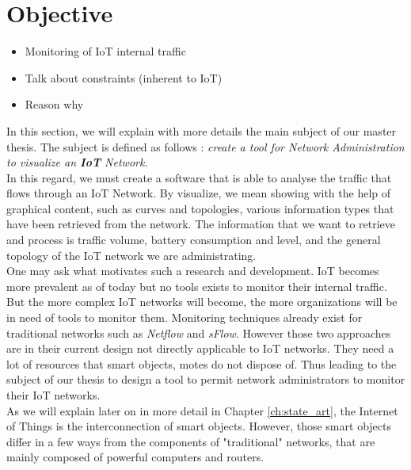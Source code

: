 \chapter{Objective} \label{ch:objective}

\begin{itemize}
	\item Monitoring of IoT internal traffic
	\item Talk about constraints (inherent to IoT)
	\item Reason why
\end{itemize}

In this section, we will explain with more details the main subject of our master thesis. The subject is defined as follows : \textit{create a tool for Network Administration to visualize an \textbf{IoT} Network}.\\

In this regard, we must create a software that is able to analyse the traffic that flows through an IoT Network. By visualize, we mean showing with the help of graphical content, such as curves and topologies, various information types that have been retrieved from the network. The information that we want to retrieve and process is traffic volume, battery consumption and level, and the general topology of the IoT network we are administrating. \\

One may ask what motivates such a research and development. IoT becomes more prevalent as of today but no tools exists to monitor their internal traffic. But the more complex IoT networks will become, the more organizations will be in need of tools to monitor them. Monitoring techniques already exist for traditional networks such as \textit{Netflow} and \textit{sFlow}. However those two approaches are in their current design not directly applicable to IoT networks. They need a lot of resources that smart objects, motes do not dispose of. Thus leading to the subject of our thesis to design a tool to permit network administrators to monitor their IoT networks.\\

As we will explain later on in more detail in Chapter \ref{ch:state_art}, the Internet of Things is the interconnection of smart objects. However, those smart objects differ in a few ways from the components of "traditional" networks, that are mainly composed of powerful computers and routers.\\

